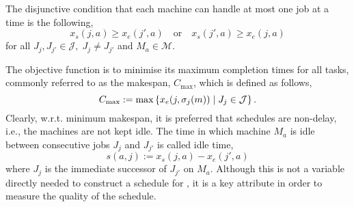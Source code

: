 The disjunctive condition that each machine can handle at most one job at a time is the following,
\begin{equation}\label{eq:oneJobPerMac}
	x_s(j,a) \geq x_e(j',a) \quad\textrm{or}\quad x_s(j',a) \geq x_e(j,a)  
\end{equation}
for all $J_j,J_{j'}\in\mathcal{J},\; J_j\neq J_{j'}$ and $M_a\in\mathcal{M}$. 

The objective function is to minimise its maximum completion times for all tasks, commonly referred to as the makespan, $C_{\max}$, which is defined as follows,
\begin{equation}
	C_{\max} := 
	\max\condset{x_e(j,\vsigma_j(m))}{J_j\in\mathcal{J}}.\label{eq:makespan}
\end{equation} 
Clearly, w.r.t. minimum makespan, it is preferred that schedules are non-delay, 
i.e., the machines are not kept idle. The time in which machine $M_a$ is idle 
between consecutive jobs $J_j$ and $J_{j'}$ is called idle time, 
\begin{equation} s(a,j):=x_s(j,a)-x_e(j',a) \label{eq:slack}\end{equation}
where $J_j$ is the immediate successor of $J_{j'}$ on $M_a$. Although this is 
not a variable directly needed to construct a schedule for \JSP, it is a key 
attribute in order to measure the quality of the schedule. 

